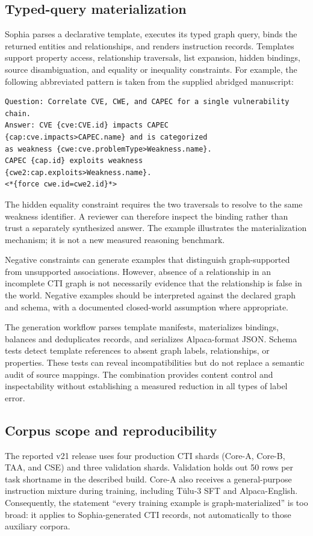\documentclass[journal]{IEEEtran}
\begin{document}
\subsection{Typed-query materialization}
Sophia parses a declarative template, executes its typed graph query, binds the returned entities and relationships, and renders instruction records. Templates support property access, relationship traversals, list expansion, hidden bindings, source disambiguation, and equality or inequality constraints. For example, the following abbreviated pattern is taken from the supplied abridged manuscript:
\begin{lstlisting}
Question: Correlate CVE, CWE, and CAPEC for a single vulnerability chain.
Answer: CVE {cve:CVE.id} impacts CAPEC
{cap:cve.impacts>CAPEC.name} and is categorized
as weakness {cwe:cve.problemType>Weakness.name}.
CAPEC {cap.id} exploits weakness
{cwe2:cap.exploits>Weakness.name}.
<*{force cwe.id=cwe2.id}*>
\end{lstlisting}
The hidden equality constraint requires the two traversals to resolve to the same weakness identifier. A reviewer can therefore inspect the binding rather than trust a separately synthesized answer. The example illustrates the materialization mechanism; it is not a new measured reasoning benchmark.

Negative constraints can generate examples that distinguish graph-supported from unsupported associations. However, absence of a relationship in an incomplete CTI graph is not necessarily evidence that the relationship is false in the world. Negative examples should be interpreted against the declared graph and schema, with a documented closed-world assumption where appropriate.

The generation workflow parses template manifests, materializes bindings, balances and deduplicates records, and serializes Alpaca-format JSON. Schema tests detect template references to absent graph labels, relationships, or properties. These tests can reveal incompatibilities but do not replace a semantic audit of source mappings. The combination provides content control and inspectability without establishing a measured reduction in all types of label error.

\subsection{Corpus scope and reproducibility}
The reported v21 release uses four production CTI shards (Core-A, Core-B, TAA, and CSE) and three validation shards. Validation holds out 50 rows per task shortname in the described build. Core-A also receives a general-purpose instruction mixture during training, including T\"ulu-3 SFT and Alpaca-English. Consequently, the statement ``every training example is graph-materialized'' is too broad: it applies to Sophia-generated CTI records, not automatically to those auxiliary corpora.
\end{document}
